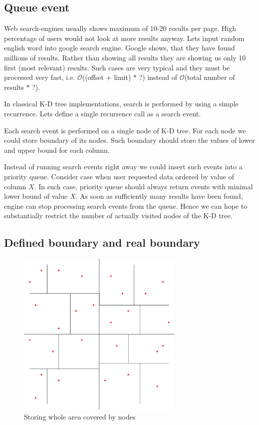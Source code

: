 \documentclass[10pt,a4paper]{article}
\newcommand{\Oh}{\mathcal{O}}
\begin{document}
\subsection{Queue event}
Web search-engines usually shows maximum of 10-20 results per page. High percentage of users would not look at more results anyway. Lets input random english word into google search engine. Google shows, that they have found millions of results. Rather than showing all results they are showing us only 10 first (most relevant) results. Such cases are very typical and they must be processed very fast, i.e. $\Oh$((offset + limit) $*$ ?) instead of $\Oh$(total number of results $*$ ?).

In classical K-D tree implementations, search is performed by using a simple recurrence. Lets define a single recurrence call as a search event.

Each search event is performed on a single node of K-D tree. For each node we could store boundary of its nodes. Such boundary should store the values of lower and upper bound for each column.

Instead of running search events right away we could insert such events into a priority queue. Consider case when user requested data ordered by value of column $X$. In such case, priority queue should always return events with minimal lower bound of value $X$. As soon as sufficiently many results have been found, engine can stop processing search events from the queue. Hence we can hope to substantially restrict the number of actually visited nodes of the K-D tree.

\subsection{Defined boundary and real boundary}

\begin{figure}
\centering
  \includegraphics[width=8cm]{Figure1}
  \caption{Storing whole area covered by nodes}
  \label{fig:covered}
\end{figure}
\end{document}
